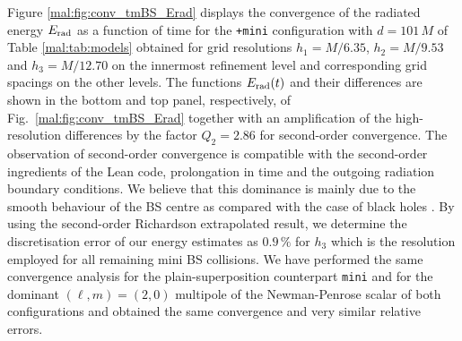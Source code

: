 Figure \ref{mal:fig:conv_tmBS_Erad} displays the convergence
of the radiated energy $E_{\rm rad}$ as a function
of time for the {\tt +mini} configuration with $d=101\,M$ of
Table \ref{mal:tab:models} obtained for grid resolutions
$h_1=M/6.35$, $h_2=M/9.53$ and $h_3=M/12.70$ on the
innermost refinement level and corresponding grid
spacings on the other levels. The functions
$E_{\rm rad}(t)$ and their differences are shown in the
bottom and top panel, respectively, of Fig.~\ref{mal:fig:conv_tmBS_Erad}
together with an amplification of the high-resolution
differences by the factor $Q_2=2.86$ for second-order
convergence. The observation of second-order convergence
is compatible with the second-order ingredients of the
{\sc Lean} code, prolongation in time and the outgoing
radiation boundary conditions. We believe that this
dominance is mainly due to the smooth behaviour
of the BS centre as compared with the case of black holes
\cite{Husa:2007hp}. By using the second-order
Richardson extrapolated result, we determine the
discretisation error of our energy estimates as
$0.9\,\%$ for $h_3$ which is the resolution employed
for all remaining mini BS collisions. We have performed
the same convergence analysis for the plain-superposition
counterpart {\tt mini} and for the dominant $(\ell,m)=(2,0)$
multipole of the Newman-Penrose scalar of both configurations
and obtained the same convergence and very similar relative
errors.
%
%

